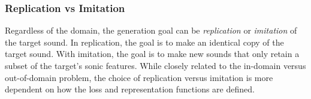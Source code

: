 \documentclass[lettersize,journal]{IEEEtran}
\providecommand{\gls}[1]{#1}
\begin{document}
\subsubsection{Replication vs Imitation}
Regardless of the domain, the generation goal can be \textit{replication} or \textit{imitation} of the target sound. In replication, the goal is to make an identical copy of the target sound. With imitation, the goal is to make new sounds that only retain a subset of the target's sonic features. While closely related to the in-domain versus out-of-domain problem, the choice of replication versus imitation is more dependent on how the loss and representation functions are defined. 



\end{document}
